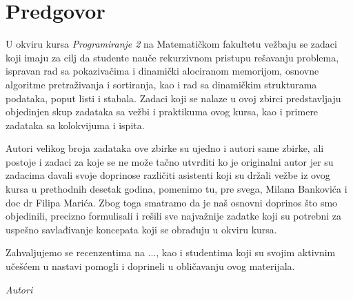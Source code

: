 
\chapter*{Predgovor}

U okviru kursa {\em Programiranje 2} na Matematičkom fakultetu vežbaju se zadaci koji imaju za cilj da studente nauče rekurzivnom pristupu rešavanju problema, ispravan rad sa pokazivačima i dinamički alociranom memorijom,  osnovne algoritme pretraživanja i sortiranja, kao i rad sa dinamičkim strukturama podataka, poput listi i stabala.  Zadaci koji se nalaze u ovoj zbirci predstavljaju objedinjen skup zadataka sa vežbi i praktikuma ovog kursa, kao i primere zadataka sa kolokvijuma i ispita. 

Autori velikog broja zadataka ove zbirke su ujedno i autori same zbirke, ali postoje i zadaci za koje se ne može tačno utvrditi ko je originalni autor jer su zadacima davali svoje doprinose različiti asistenti koji su držali vežbe iz ovog kursa u prethodnih desetak godina, pomenimo tu, pre svega, Milana Bankovića i doc dr Filipa Marića. Zbog toga smatramo da je naš osnovni doprinos što smo objedinili, precizno formulisali i rešili sve najvažnije zadatke koji su potrebni za uspešno savlađivanje koncepata koji se obrađuju u okviru kursa. 

Zahvaljujemo se recenzentima na ..., kao i studentima koji su svojim aktivnim učešćem u nastavi pomogli i doprineli u obličavanju ovog materijala. 




\bigskip

\begin{flushright}
{\em Autori}
\end{flushright}
